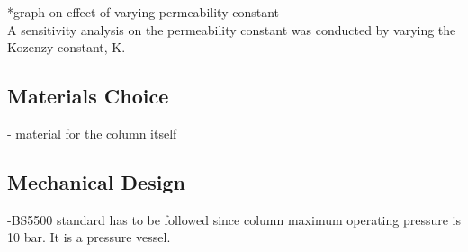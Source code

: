 *graph on effect of varying permeability constant
\\A sensitivity analysis on the permeability constant was conducted by varying the Kozenzy constant, K. 


\subsection{Materials Choice}
- material for the column itself 

\subsection{Mechanical Design}
-BS5500 standard has to be followed since column maximum operating pressure is 10 bar. It is a pressure vessel.  
